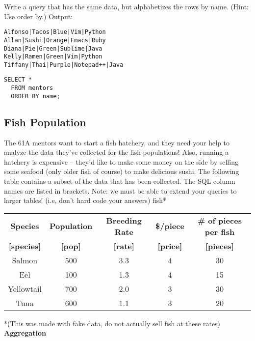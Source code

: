 \documentclass{exam}
\begin{document}
\begin{questions}
\begin{blocksection}
\question Write a query that has the same data, but alphabetizes the rows by name. (Hint: Use order by.) \newline
Output:
\begin{lstlisting}
Alfonso|Tacos|Blue|Vim|Python
Allan|Sushi|Orange|Emacs|Ruby
Diana|Pie|Green|Sublime|Java
Kelly|Ramen|Green|Vim|Python
Tiffany|Thai|Purple|Notepad++|Java
\end{lstlisting}
\begin{solution}[1in]
\begin{lstlisting}
SELECT * 
  FROM mentors
  ORDER BY name;
\end{lstlisting}
\end{solution}
\end{blocksection}


\begin{blocksection}
\section{Fish Population} 
The 61A mentors want to start a fish hatchery, and they need your help to analyze the data they've collected for the fish populations! Also, running a hatchery is expensive -- they'd like to make some money on the side by selling some seafood (only older fish of course) to make delicious sushi. \newline
\newline
The following table contains a subset of the data that has been collected. The SQL column names are listed in brackets. Note: we must be able to extend your queries to larger tables! (i.e, don't hard code your answers) \newline
\newline
fish*
\begin{center}
\begin{tabular}{ |c|c|c|c|c| } 
 \hline
 \textbf{Species} & \textbf{Population} & \textbf{Breeding Rate} & \textbf{\$/piece} & \textbf{\# of pieces per fish} \\ 
  \textbf{[species]} & \textbf{[pop]} & \textbf{[rate]} & \textbf{[price]} & \textbf{[pieces]} \\ 
 \hline
 Salmon & 500 & 3.3 & 4 & 30 \\ 
 \hline
 Eel & 100 & 1.3 & 4 & 15 \\ 
 \hline
  Yellowtail & 700 & 2.0 & 3 & 30 \\ 
 \hline
 Tuna & 600 & 1.1 & 3 & 20 \\ 
 \hline
\end{tabular}
\end{center}
*(This was made with fake data, do not actually sell fish at these rates)
\question \textbf{Aggregation} 
\begin{parts}

\end{parts}
\end{blocksection}
\end{questions}
\end{document}
